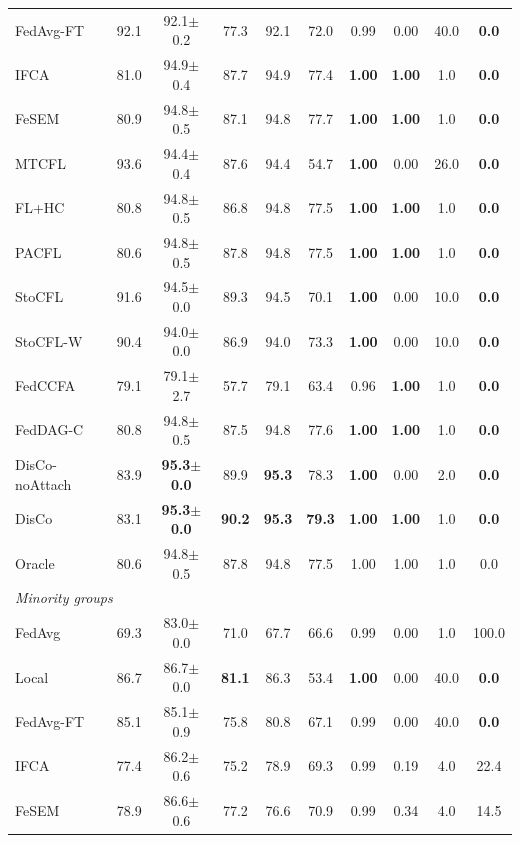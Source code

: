 \begin{tabular}{lccccccccc}
FedAvg-FT & 92.1 & 92.1$\pm$0.2 & 77.3 & 92.1 & 72.0 & 0.99 & 0.00 & 40.0 & \textbf{0.0} \\
IFCA & 81.0 & 94.9$\pm$0.4 & 87.7 & 94.9 & 77.4 & \textbf{1.00} & \textbf{1.00} & 1.0 & \textbf{0.0} \\
FeSEM & 80.9 & 94.8$\pm$0.5 & 87.1 & 94.8 & 77.7 & \textbf{1.00} & \textbf{1.00} & 1.0 & \textbf{0.0} \\
MTCFL & 93.6 & 94.4$\pm$0.4 & 87.6 & 94.4 & 54.7 & \textbf{1.00} & 0.00 & 26.0 & \textbf{0.0} \\
FL+HC & 80.8 & 94.8$\pm$0.5 & 86.8 & 94.8 & 77.5 & \textbf{1.00} & \textbf{1.00} & 1.0 & \textbf{0.0} \\
PACFL & 80.6 & 94.8$\pm$0.5 & 87.8 & 94.8 & 77.5 & \textbf{1.00} & \textbf{1.00} & 1.0 & \textbf{0.0} \\
StoCFL & 91.6 & 94.5$\pm$0.0 & 89.3 & 94.5 & 70.1 & \textbf{1.00} & 0.00 & 10.0 & \textbf{0.0} \\
StoCFL-W & 90.4 & 94.0$\pm$0.0 & 86.9 & 94.0 & 73.3 & \textbf{1.00} & 0.00 & 10.0 & \textbf{0.0} \\
FedCCFA & 79.1 & 79.1$\pm$2.7 & 57.7 & 79.1 & 63.4 & 0.96 & \textbf{1.00} & 1.0 & \textbf{0.0} \\
FedDAG-C & 80.8 & 94.8$\pm$0.5 & 87.5 & 94.8 & 77.6 & \textbf{1.00} & \textbf{1.00} & 1.0 & \textbf{0.0} \\
DisCo-noAttach & 83.9 & \textbf{95.3$\pm$0.0} & 89.9 & \textbf{95.3} & 78.3 & \textbf{1.00} & 0.00 & 2.0 & \textbf{0.0} \\
DisCo & 83.1 & \textbf{95.3$\pm$0.0} & \textbf{90.2} & \textbf{95.3} & \textbf{79.3} & \textbf{1.00} & \textbf{1.00} & 1.0 & \textbf{0.0} \\
Oracle & 80.6 & 94.8$\pm$0.5 & 87.8 & 94.8 & 77.5 & 1.00 & 1.00 & 1.0 & 0.0 \\
\midrule
\multicolumn{10}{l}{\textit{Minority groups}}\\
FedAvg & 69.3 & 83.0$\pm$0.0 & 71.0 & 67.7 & 66.6 & 0.99 & 0.00 & 1.0 & 100.0 \\
Local & 86.7 & 86.7$\pm$0.0 & \textbf{81.1} & 86.3 & 53.4 & \textbf{1.00} & 0.00 & 40.0 & \textbf{0.0} \\
FedAvg-FT & 85.1 & 85.1$\pm$0.9 & 75.8 & 80.8 & 67.1 & 0.99 & 0.00 & 40.0 & \textbf{0.0} \\
IFCA & 77.4 & 86.2$\pm$0.6 & 75.2 & 78.9 & 69.3 & 0.99 & 0.19 & 4.0 & 22.4 \\
FeSEM & 78.9 & 86.6$\pm$0.6 & 77.2 & 76.6 & 70.9 & 0.99 & 0.34 & 4.0 & 14.5 \\

\end{tabular}

